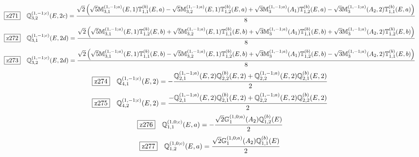 \documentclass[fleqn,10pt,landscape]{jsarticle}
\begin{document}
\begin{dmath*}
\hspace*{3mm}\fbox{z271}\quad \mathbb{Q}_{3,2}^{(1,-1;c)}(E,2c)=\frac{\sqrt{2} \left(\sqrt{5} \mathbb{M}_{3,1}^{(1,-1;a)}(E,1) \mathbb{T}_{1,1}^{(b)}(E,a) - \sqrt{5} \mathbb{M}_{3,2}^{(1,-1;a)}(E,1) \mathbb{T}_{1,2}^{(b)}(E,a) + \sqrt{3} \mathbb{M}_{3}^{(1,-1;a)}(A_{1}) \mathbb{T}_{1,2}^{(b)}(E,a) - \sqrt{3} \mathbb{M}_{3}^{(1,-1;a)}(A_{2},2) \mathbb{T}_{1,1}^{(b)}(E,a)\right)}{8}
\end{dmath*}
\begin{dmath*}
\hspace*{3mm}\fbox{z272}\quad \mathbb{Q}_{3,1}^{(1,-1;c)}(E,2d)=\frac{\sqrt{2} \left(\sqrt{5} \mathbb{M}_{3,1}^{(1,-1;a)}(E,1) \mathbb{T}_{1,2}^{(b)}(E,b) + \sqrt{5} \mathbb{M}_{3,2}^{(1,-1;a)}(E,1) \mathbb{T}_{1,1}^{(b)}(E,b) + \sqrt{3} \mathbb{M}_{3}^{(1,-1;a)}(A_{1}) \mathbb{T}_{1,1}^{(b)}(E,b) + \sqrt{3} \mathbb{M}_{3}^{(1,-1;a)}(A_{2},2) \mathbb{T}_{1,2}^{(b)}(E,b)\right)}{8}
\end{dmath*}
\begin{dmath*}
\hspace*{3mm}\fbox{z273}\quad \mathbb{Q}_{3,2}^{(1,-1;c)}(E,2d)=\frac{\sqrt{2} \left(\sqrt{5} \mathbb{M}_{3,1}^{(1,-1;a)}(E,1) \mathbb{T}_{1,1}^{(b)}(E,b) - \sqrt{5} \mathbb{M}_{3,2}^{(1,-1;a)}(E,1) \mathbb{T}_{1,2}^{(b)}(E,b) + \sqrt{3} \mathbb{M}_{3}^{(1,-1;a)}(A_{1}) \mathbb{T}_{1,2}^{(b)}(E,b) - \sqrt{3} \mathbb{M}_{3}^{(1,-1;a)}(A_{2},2) \mathbb{T}_{1,1}^{(b)}(E,b)\right)}{8}
\end{dmath*}
\begin{dmath*}
\hspace*{3mm}\fbox{z274}\quad \mathbb{Q}_{4,1}^{(1,-1;c)}(E,2)=- \frac{\mathbb{Q}_{2,1}^{(1,-1;a)}(E,2) \mathbb{Q}_{2,2}^{(b)}(E,2) + \mathbb{Q}_{2,2}^{(1,-1;a)}(E,2) \mathbb{Q}_{2,1}^{(b)}(E,2)}{2}
\end{dmath*}
\begin{dmath*}
\hspace*{3mm}\fbox{z275}\quad \mathbb{Q}_{4,2}^{(1,-1;c)}(E,2)=\frac{- \mathbb{Q}_{2,1}^{(1,-1;a)}(E,2) \mathbb{Q}_{2,1}^{(b)}(E,2) + \mathbb{Q}_{2,2}^{(1,-1;a)}(E,2) \mathbb{Q}_{2,2}^{(b)}(E,2)}{2}
\end{dmath*}
\begin{dmath*}
\hspace*{3mm}\fbox{z276}\quad \mathbb{Q}_{1,1}^{(1,0;c)}(E,a)=- \frac{\sqrt{2} \mathbb{G}_{1}^{(1,0;a)}(A_{2}) \mathbb{Q}_{1,2}^{(b)}(E)}{2}
\end{dmath*}
\begin{dmath*}
\hspace*{3mm}\fbox{z277}\quad \mathbb{Q}_{1,2}^{(1,0;c)}(E,a)=\frac{\sqrt{2} \mathbb{G}_{1}^{(1,0;a)}(A_{2}) \mathbb{Q}_{1,1}^{(b)}(E)}{2}
\end{dmath*}
\end{document}
